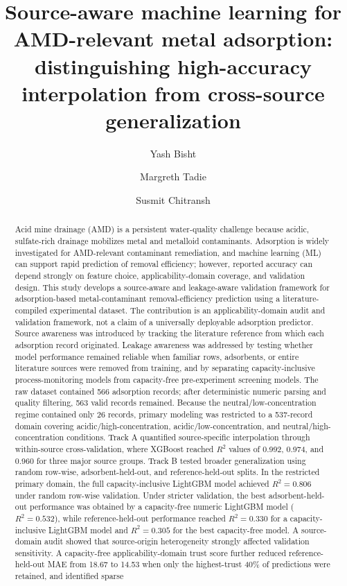 \documentclass[review,12pt,number]{elsarticle}
\begin{document}
\begin{frontmatter}

\title{Source-aware machine learning for AMD-relevant metal adsorption: distinguishing high-accuracy interpolation from cross-source generalization}

\author[inst1]{Yash Bisht}
\author[inst2]{Margreth Tadie}
\author[inst2]{Susmit Chitransh}

\address[inst1]{Department of Mechanical and Industrial Engineering, Indian Institute of Technology Roorkee, Roorkee 247667, Uttarakhand, India}
\address[inst2]{Department of Chemical Engineering, Stellenbosch University, Stellenbosch, Cape Town, South Africa}

\begin{abstract}
Acid mine drainage (AMD) is a persistent water-quality challenge because acidic, sulfate-rich drainage mobilizes metal and metalloid contaminants. Adsorption is widely investigated for AMD-relevant contaminant remediation, and machine learning (ML) can support rapid prediction of removal efficiency; however, reported accuracy can depend strongly on feature choice, applicability-domain coverage, and validation design. This study develops a source-aware and leakage-aware validation framework for adsorption-based metal-contaminant removal-efficiency prediction using a literature-compiled experimental dataset. The contribution is an applicability-domain audit and validation framework, not a claim of a universally deployable adsorption predictor. Source awareness was introduced by tracking the literature reference from which each adsorption record originated. Leakage awareness was addressed by testing whether model performance remained reliable when familiar rows, adsorbents, or entire literature sources were removed from training, and by separating capacity-inclusive process-monitoring models from capacity-free pre-experiment screening models. The raw dataset contained 566 adsorption records; after deterministic numeric parsing and quality filtering, 563 valid records remained. Because the neutral/low-concentration regime contained only 26 records, primary modeling was restricted to a 537-record domain covering acidic/high-concentration, acidic/low-concentration, and neutral/high-concentration conditions. Track A quantified source-specific interpolation through within-source cross-validation, where XGBoost reached $R^2$ values of 0.992, 0.974, and 0.960 for three major source groups. Track B tested broader generalization using random row-wise, adsorbent-held-out, and reference-held-out splits. In the restricted primary domain, the full capacity-inclusive LightGBM model achieved $R^2 = 0.806$ under random row-wise validation. Under stricter validation, the best adsorbent-held-out performance was obtained by a capacity-free numeric LightGBM model ($R^2 = 0.532$), while reference-held-out performance reached $R^2 = 0.330$ for a capacity-inclusive LightGBM model and $R^2 = 0.305$ for the best capacity-free model. A source-domain audit showed that source-origin heterogeneity strongly affected validation sensitivity. A capacity-free applicability-domain trust score further reduced reference-held-out MAE from 18.67 to 14.53 when only the highest-trust 40\% of predictions were retained, and identified sparse 
\end{abstract}
\end{frontmatter}
\end{document}
